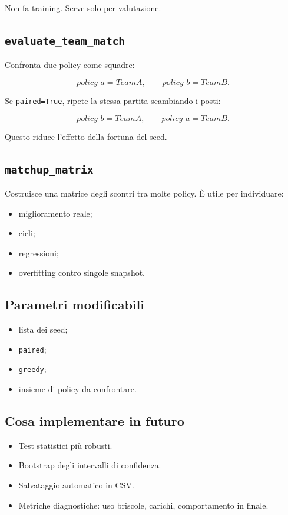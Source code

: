 \documentclass[11pt,a4paper]{article}
\begin{document}
Non fa training. Serve solo per valutazione.

\subsection{\texttt{evaluate\_team\_match}}

Confronta due policy come squadre:

\[
policy\_a = Team A, \qquad policy\_b = Team B.
\]

Se \texttt{paired=True}, ripete la stessa partita scambiando i posti:

\[
policy\_b = Team A, \qquad policy\_a = Team B.
\]

Questo riduce l'effetto della fortuna del seed.

\subsection{\texttt{matchup\_matrix}}

Costruisce una matrice degli scontri tra molte policy. È utile per individuare:

\begin{itemize}
  \item miglioramento reale;
  \item cicli;
  \item regressioni;
  \item overfitting contro singole snapshot.
\end{itemize}

\subsection{Parametri modificabili}

\begin{itemize}
  \item lista dei seed;
  \item \texttt{paired};
  \item \texttt{greedy};
  \item insieme di policy da confrontare.
\end{itemize}

\subsection{Cosa implementare in futuro}

\begin{itemize}
  \item Test statistici più robusti.
  \item Bootstrap degli intervalli di confidenza.
  \item Salvataggio automatico in CSV.
  \item Metriche diagnostiche: uso briscole, carichi, comportamento in finale.
\end{itemize}
\end{document}
